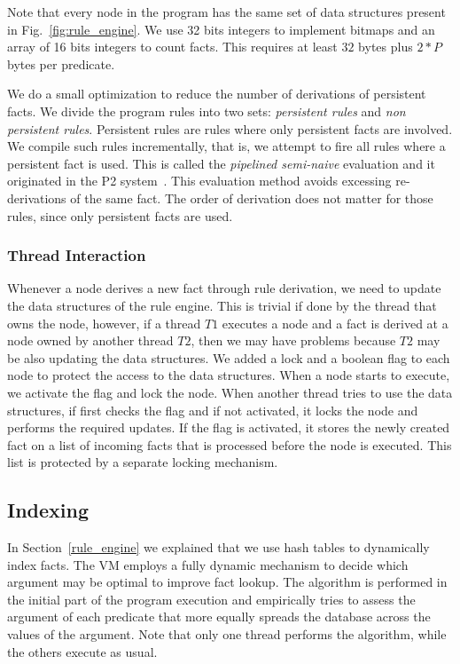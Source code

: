 Note that every node in the program has the same set of data structures present in Fig.~\ref{fig:rule_engine}.
We use 32 bits integers to implement bitmaps and an array of 16 bits integers to count facts. This requires
at least $32$ bytes plus $2 * P$ bytes per predicate.

We do a small optimization to reduce the number of derivations of persistent facts. We
divide the program rules into two sets: \emph{persistent rules} and \emph{non persistent rules}.
Persistent rules are rules where only persistent facts are involved. We compile such rules
incrementally, that is, we attempt to fire all rules where a persistent fact is used. This is called
the \emph{pipelined semi-naive} evaluation and it originated in the P2 system~\cite{Loo-condie-garofalakis-p2}.
This evaluation method avoids excessing re-derivations of the same fact. The order of derivation does not matter for those rules, since
only persistent facts are used.

\subsubsection{Thread Interaction}

Whenever a node derives a new fact through rule derivation, we need to update the data structures of the rule engine.
This is trivial if done by the thread that owns the node, however, if a thread $T1$ executes a node and a fact is derived
at a node owned by another thread $T2$, then we may have problems because $T2$ may be also updating the data structures.
We added a lock and a boolean flag to each node to protect the access to the data structures. When a node starts to execute,
we activate the flag and lock the node. When another thread tries to use the data structures, if first checks the flag and if
not activated, it locks the node and performs the required updates. If the flag is activated, it stores the newly created fact
on a list of incoming facts that is processed before the node is executed. This list is protected by a separate locking mechanism.

\subsection{Indexing}\label{indexing}

In Section~\ref{rule_engine} we explained that we use hash tables to dynamically index facts.
The VM employs a fully dynamic mechanism to decide which argument may be optimal to improve fact lookup.
The algorithm is performed in the initial part of the program execution and empirically tries to assess the argument
of each predicate that more equally spreads the database across the values of the argument. Note that only one thread
performs the algorithm, while the others execute as usual.

